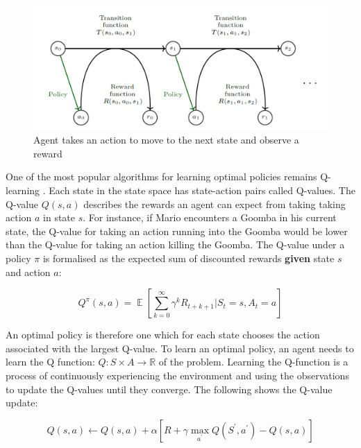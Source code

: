 \documentclass[notitlepage,a4paper,11pt]{article}
\newcommand{\R}{\mathbb{R}}
\DeclareMathOperator{\E}{\mathbb{E}}
\begin{document}
\begin{figure}[!htb]
\centering
\includegraphics[width=.5\linewidth]{figs/mdp_detail.png}
\caption{Agent takes an action to move to the next state and observe a reward \protect\cite{franccois2018introduction}} \label{fig:2}
\end{figure}

One of the most popular algorithms for learning optimal policies remains Q-learning \cite{watkins1992q}. Each state in the state space has state-action pairs called Q-values. The Q-value $Q(s,a)$ describes the rewards an agent can expect from taking taking action $a$ in state $s$. For instance, if Mario encounters a Goomba in his current state, the Q-value for taking an action running into the Goomba would be lower than the Q-value for taking an action killing the Goomba. The Q-value under a policy $\pi$ is formalised as the expected sum of discounted rewards \textbf{given} state $s$ and action $a$:

\begin{equation}
 Q^\pi(s, a) = \E \left[ \sum_{k=0}^{\infty} \gamma^k R_{t+k+1} \Big| S_t = s, A_t = a \right]
\end{equation}


An optimal policy is therefore one which for each state chooses the action associated with the largest Q-value. To learn an optimal policy, an agent needs to learn the Q function: $Q : S \times A \to \R$ of the problem. Learning the Q-function is a process of continuously experiencing the environment and using the observations to update the Q-values until they converge. The following shows the Q-value update:

\begin{equation} \label{q_update}
	Q(s,a) \gets Q(s,a) + \alpha \left[ R + \gamma \max\limits_{a^\prime} Q(S^\prime, a^\prime) - Q(s,a) \right]
\end{equation}
\end{document}
